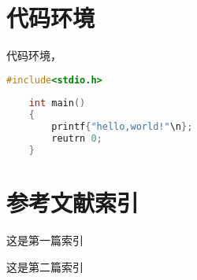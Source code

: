 \section*{代码环境}

代码环境，

\begin{lstlisting}[language=C,style=monokai,caption={Hello,world}]
	#include<stdio.h>
	
	int main()
	{
		printf{"hello,world!"\n};
		reutrn 0;
	}
\end{lstlisting}

\section*{参考文献索引}

这是第一篇索引\cite{swierad2016ultra}

这是第二篇索引\cite{chen2014compact}